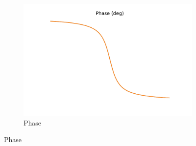 \documentclass[11pt, reqno]{article}    %
\begin{document}
\begin{enumerate}
\begin{figure}[htbp]
\begin{subfigure}[htbp]{0.5\textwidth}
            \includegraphics[width=\textwidth]{phase.pdf} 
            \caption{Phase} 
        \end{subfigure}
        \end{figure}
\end{enumerate}
\end{document}
